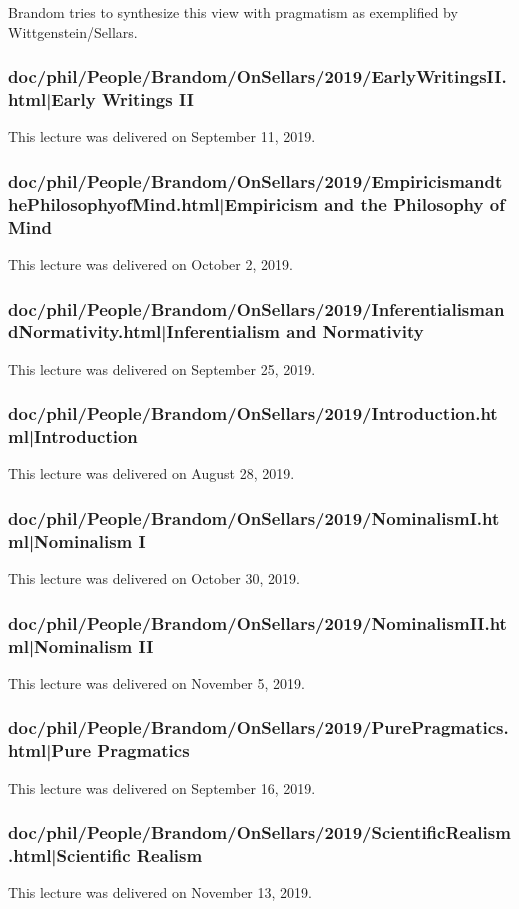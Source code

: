 \documentclass[12pt,a4paper]{report}
\begin{document}
Brandom tries to synthesize this view with pragmatism as exemplified by Wittgenstein/Sellars.
\subsubsection{doc/phil/People/Brandom/OnSellars/2019/EarlyWritingsII.html|Early Writings II}
This lecture was delivered on September 11, 2019.

\subsubsection{doc/phil/People/Brandom/OnSellars/2019/EmpiricismandthePhilosophyofMind.html|Empiricism and the Philosophy of Mind}
This lecture was delivered on October 2, 2019.

\subsubsection{doc/phil/People/Brandom/OnSellars/2019/InferentialismandNormativity.html|Inferentialism and Normativity}
This lecture was delivered on September 25, 2019.

\subsubsection{doc/phil/People/Brandom/OnSellars/2019/Introduction.html|Introduction}
This lecture was delivered on August 28, 2019.

\subsubsection{doc/phil/People/Brandom/OnSellars/2019/NominalismI.html|Nominalism I}
This lecture was delivered on October 30, 2019.

\subsubsection{doc/phil/People/Brandom/OnSellars/2019/NominalismII.html|Nominalism II}
This lecture was delivered on November 5, 2019.

\subsubsection{doc/phil/People/Brandom/OnSellars/2019/PurePragmatics.html|Pure Pragmatics}
This lecture was delivered on September 16, 2019.

\subsubsection{doc/phil/People/Brandom/OnSellars/2019/ScientificRealism.html|Scientific Realism}
This lecture was delivered on November 13, 2019.
\end{document}
